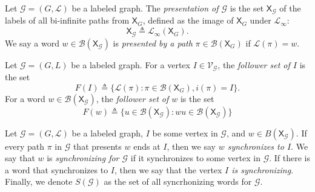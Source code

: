 \documentclass{article}
\newcommand{\Lc}{\mathcal{L}}  %
\newcommand{\Gc}{\mathcal{G}}  %
\newcommand{\Vc}{\mathcal{V}}
\newcommand{\Bc}{\mathcal{B}}
\newcommand{\shift}[1]{\mathsf{X}_{#1}}
\newcommand{\term}[1]{\textit{#1}}
\theoremstyle{definition}
\begin{document}
\begin{definition}
    Let \(\Gc = (G, \Lc)\) be a labeled graph. The \term{presentation of \(\Gc\)} is the set \(\shift{\Gc}\)
    of the labels of all bi-infinite paths from \(\shift{G}\), defined as the image of 
    \(\shift{G}\) under \(\Lc_\infty\): \[\shift{\Gc} \triangleq \Lc_\infty(\shift{G}).\]
    We say a word \(w \in \Bc(\shift{\Gc})\) is \term{presented by a path} \(\pi \in \Bc(\shift{G})\) if \(\Lc(\pi) = w\).
\end{definition}

\begin{definition}
    Let \(\Gc = (G, L)\) be a labeled graph. For a vertex \(I \in \Vc_\Gc\), the 
    \term{follower set of \(I\)} is the set 
    \[F(I) \triangleq \big\{ \Lc(\pi) : \pi \in \Bc(\shift{G}), i(\pi) = I \big\}.\]
    For a word \(w \in \Bc(\shift{\Gc})\), the \term{follower set of \(w\)}
    is the set 
    \[F(w) \triangleq \big\{ u \in \Bc(\shift{\Gc}) : wu \in \Bc(\shift{\Gc})\big\}\]
\end{definition}

\begin{definition}
    Let \(\Gc = (G, \Lc)\) be a labeled graph, \(I\) be some vertex in \(\Gc\), and \(w \in B(\shift{\Gc})\).
    If every path \(\pi\) in \(\Gc\) that presents \(w\) ends at \(I\), then we say \term{\(w\) synchronizes to \(I\)}.
    We say that \(w\) is \term{synchronizing for \(\Gc\)} if it synchronizes to some vertex in \(\Gc\). 
    If there is a word that synchronizes to \(I\), then we say that the vertex \term{\(I\) is synchronizing}.
    Finally, we denote 
    \(S(\Gc)\) as the set of all syncrhonizing words for \(\Gc\).
\end{definition}



\end{document}
